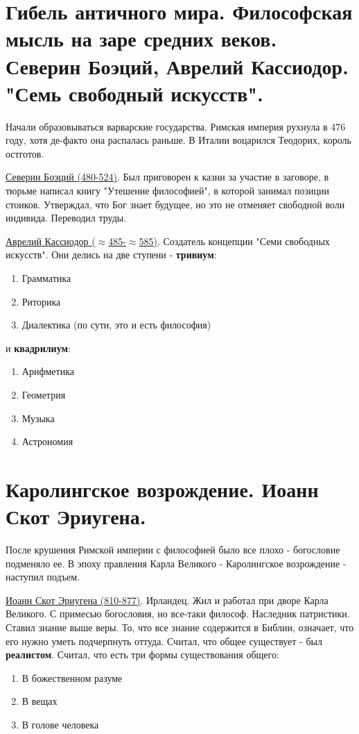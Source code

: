 \documentclass[12pt,a4paper]{article}
\begin{document}
\section{Гибель античного мира. Философская мысль на заре средних веков. Северин Боэций, Аврелий Кассиодор. "Семь свободный искусств". }
Начали образовываться варварские государства. Римская империя рухнула в 476 году, хотя де-факто она распалась раньше. В Италии воцарился Теодорих, король остготов. 

\underline{Северин Боэций (480-524)}. Был приговорен к казни за участие в заговоре, в тюрьме написал книгу "Утешение философией", в которой занимал позиции стоиков. Утверждал, что Бог знает будущее, но это не отменяет свободной воли индивида. Переводил труды.

\underline{Аврелий Кассиодор ($\approx$485-$\approx$585)}. Создатель концепции "Семи свободных искусств". Они делись на две ступени -  \textbf{тривиум}:
\begin{enumerate}
\item Грамматика
\item Риторика
\item Диалектика (по сути, это и есть философия)
\end{enumerate}
и \textbf{квадрилиум}:
\begin{enumerate}
\item Арифметика
\item Геометрия
\item Музыка
\item Астрономия
\end{enumerate}

\section{Каролингское возрождение. Иоанн Скот Эриугена.}
После крушения Римской империи с философией было все плохо - богословие подменяло ее. В эпоху правления Карла Великого - Каролингское возрождение - наступил подъем. 

\underline{Иоанн Скот Эриугена (810-877)}. Ирландец. Жил и работал при дворе Карла Великого. С примесью  богословия, но все-таки философ. Наследник патристики. Ставил знание выше веры. То, что все знание содержится в Библии, означает, что его нужно уметь подчерпнуть оттуда. Считал, что общее существует - был \textbf{реалистом}. Считал, что есть три формы существования общего: 
\begin{enumerate}
\item В божественном разуме
\item В вещах
\item В голове человека
\end{enumerate}
\end{document}
